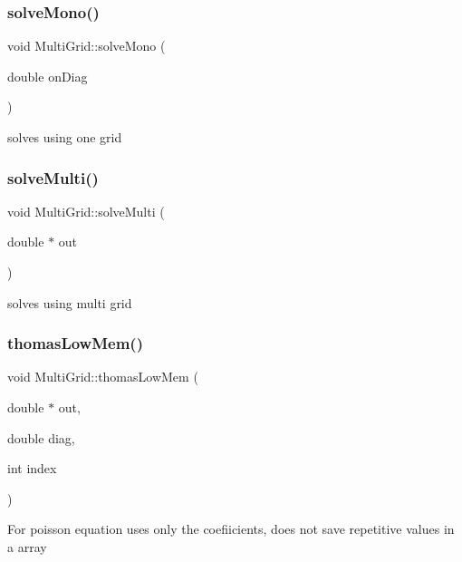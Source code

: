 \subsubsection{\texorpdfstring{solve\+Mono()}{solveMono()}}
{\footnotesize\ttfamily void Multi\+Grid\+::solve\+Mono (\begin{DoxyParamCaption}\item[{double}]{on\+Diag }\end{DoxyParamCaption})}

solves using one grid \mbox{\label{classMultiGrid_a6b14d3f7da004282770fd7606bd06a27}} 
\subsubsection{\texorpdfstring{solve\+Multi()}{solveMulti()}}
{\footnotesize\ttfamily void Multi\+Grid\+::solve\+Multi (\begin{DoxyParamCaption}\item[{double $\ast$}]{out }\end{DoxyParamCaption})}

solves using multi grid \mbox{\label{classMultiGrid_ab84905fee399df9379238a11bd7cd308}} 
\subsubsection{\texorpdfstring{thomas\+Low\+Mem()}{thomasLowMem()}}
{\footnotesize\ttfamily void Multi\+Grid\+::thomas\+Low\+Mem (\begin{DoxyParamCaption}\item[{double $\ast$}]{out,  }\item[{double}]{diag,  }\item[{int}]{index }\end{DoxyParamCaption})}

For poisson equation uses only the coefiicients, does not save repetitive values in a array \mbox{\label{classMultiGrid_ade19e917a66caba115c0fb1975ae9906}} 
